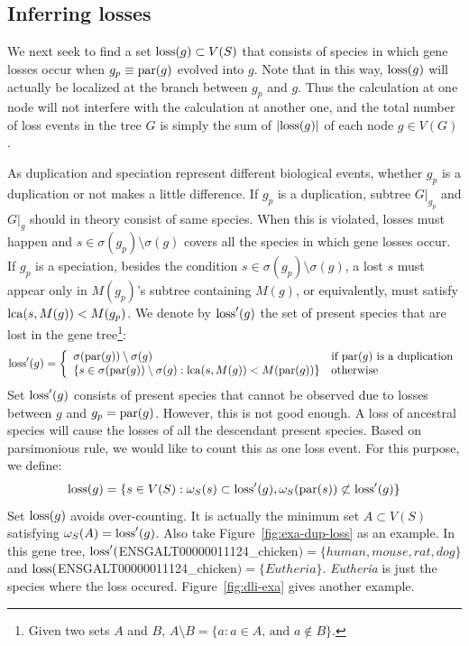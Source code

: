 \subsection{Inferring losses}

We next seek to find a set $\mathrm{loss}(g)\subset V(S)$ that consists of species in which
gene losses occur when $g_p\equiv\mathrm{par}(g)$ evolved into $g$. Note that
in this way, $\mathrm{loss}(g)$ will actually be localized at the branch between $g_p$ and $g$.
Thus the calculation at one node will not interfere with the calculation at another one, and
the total number of loss events in the tree $G$ is simply the sum of $|\mathrm{loss}(g)|$ of each node $g\in V(G)$.

As duplication and speciation represent different biological events, whether
$g_p$ is a duplication or not makes a little difference.
If $g_p$ is a duplication, subtree $G|_{g_p}$ and $G|_g$ should in theory consist of
same species. When this is violated, losses must happen and
$s\in\sigma(g_p)\setminus\sigma(g)$ covers all the species in which gene
losses occur. If $g_p$ is a speciation, besides the condition $s\in\sigma(g_p)\setminus\sigma(g)$,
a lost $s$ must appear only in $M(g_p)$'s subtree containing $M(g)$, or equivalently,
must satisfy $\mathrm{lca}(s,M(g))<M(g_p)$. We denote by $\mathrm{loss}'(g)$ the set of
present species that are lost in the gene tree\footnote{Given two sets $A$ and $B$,
$A\setminus B=\{a:\mbox{$a\in A$, and $a\notin B$}\}$.}:
\begin{equation}\label{equ:loss1}
\mathrm{loss}'(g)=\left\{\begin{array}{ll}
	\sigma(\mathrm{par}(g))\setminus\sigma(g) & \mbox{if $\mathrm{par}(g)$ is a duplication} \\
	\left\{s\in\sigma(\mathrm{par}(g))\setminus\sigma(g):\mathrm{lca}(s,M(g))<M(\mathrm{par}(g))\right\} & \mbox{otherwise}
	\end{array}\right.
\end{equation}
Set $\mathrm{loss}'(g)$ consists of present species that cannot be observed due to losses between $g$ and $g_p=\mathrm{par}(g)$.
However, this is not good enough. A loss of ancestral species will cause the losses of
all the descendant present species. Based on parsimonious rule, we would like to count this as one loss event.
For this purpose, we define:
\begin{equation}\label{equ:loss2}
\mathrm{loss}(g)=\{s\in V(S):\omega_S(s)\subset\mathrm{loss}'(g),\omega_S(\mathrm{par}(s))\not\subset\mathrm{loss}'(g)\}
\end{equation}
Set $\mathrm{loss}(g)$ avoids over-counting. It is actually the minimum set $A\subset V(S)$ satisfying $\omega_S(A)=\mathrm{loss}'(g)$.
Also take Figure~\ref{fig:exa-dup-loss} as an example. In this gene tree,
$\mathrm{loss}'(${\sf ENSGALT00000011124\_chicken}$)=\{\mathit{human,mouse,rat,dog}\}$ and
$\mathrm{loss}(${\sf ENSGALT00000011124\_chicken}$)=\{\mathit{Eutheria}\}$. {\it Eutheria} is just the species where the loss occured.
Figure~\ref{fig:dli-exa} gives another example.

